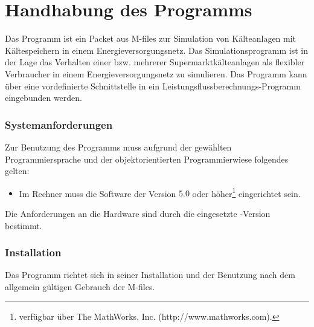 \section{Handhabung des Programms}
\label{sc:handhabung}

Das Programm ist ein Packet aus \matlab M-files zur Simulation von Kälteanlagen
mit Kältespeichern in einem Energieversorgungsnetz. Das Simulationsprogramm ist
in der Lage das Verhalten einer bzw. mehrerer Supermarktkälteanlagen als
flexibler Verbraucher in einem Energieversorgungsnetz zu simulieren. Das
Programm kann über eine vordefinierte Schnittstelle in ein
Leistungsflussberechnungs-Programm eingebunden werden.

\subsubsection{Systemanforderungen}

Zur Benutzung des Programms muss aufgrund der gewählten Programmiersprache und
der objektorientierten Programmierwiese folgendes gelten:

\begin{itemize}
	\item Im Rechner muss die Software \matlab der Version $5.0$ oder
	höher\footnote{ \matlab verfügbar über The MathWorks, Inc.
	(http://www.mathworks.com).} eingerichtet sein.
\end{itemize}

Die Anforderungen an die Hardware sind durch die eingesetzte \matlab-Version
bestimmt.

\subsubsection{Installation}

Das Programm richtet sich in seiner Installation und der Benutzung nach dem
allgemein gültigen Gebrauch der \matlab M-files.

